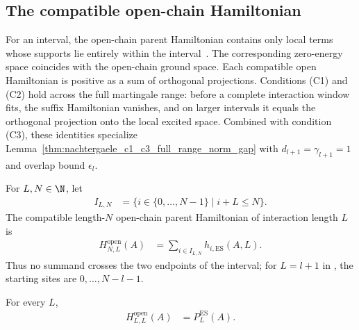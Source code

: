 \subsection{The compatible open-chain Hamiltonian}%
\label{subsec:compatible_open_chain_hamiltonian}

For an interval, the open-chain parent Hamiltonian contains only local terms
whose supports lie entirely within the
interval~\cite[Equation~(3.12)]{Nachtergaele1996Spectral}. The corresponding
zero-energy space coincides with the open-chain ground space. Each compatible
open Hamiltonian is positive as a sum of orthogonal projections. Conditions
(C1) and (C2) hold across the full martingale range: before a complete
interaction window fits, the suffix Hamiltonian vanishes, and on larger
intervals it equals the orthogonal projection onto the local excited space.
Combined with condition (C3), these identities specialize
Lemma~\ref{thm:nachtergaele_c1_c3_full_range_norm_gap} with
$d_{l+1}=\gamma_{l+1}=1$ and overlap bound $\epsilon_l$.

\begin{definition}
    \label{def:open_parent_hamiltonian_es}
    \leanok
    For $L,N\in\N$, let
    \begin{align}
        I_{L,N} & =\{i\in\{0,\ldots,N-1\}\mid i+L\leq N\}.
    \end{align}
    The compatible length-$N$ open-chain parent Hamiltonian of interaction
    length $L$ is
    \begin{align}
        H^{\mathrm{open}}_{N,L}(A)
         & =\sum_{i\in I_{L,N}}h_{i,\mathrm{ES}}(A,L).
        \label{eq:open_parent_hamiltonian_es}
    \end{align}
    Thus no summand crosses the two endpoints of the interval; for
    $L=l+1$ in \cite[Equation~(3.12)]{Nachtergaele1996Spectral}, the starting
    sites are $0,\ldots,N-l-1$.
\end{definition}

\begin{lemma}
    \label{thm:open_parent_hamiltonian_full_window}
    \leanok
    For every $L$,
    \begin{align}
        H^{\mathrm{open}}_{L,L}(A)
         & =P_L^{\mathrm{ES}}(A).
        \label{eq:open_parent_hamiltonian_full_window}
    \end{align}
\end{lemma}

